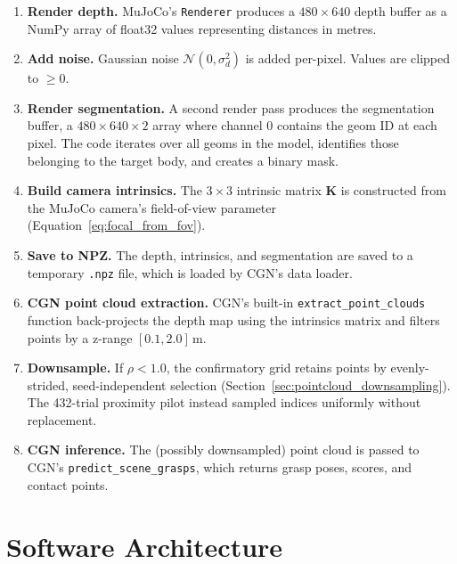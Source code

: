 \documentclass[11pt,a4paper]{report}
\begin{document}
\begin{enumerate}
  \item \textbf{Render depth.} MuJoCo's \texttt{Renderer} produces a $480 \times 640$ depth buffer as a NumPy array of float32 values representing distances in metres.

  \item \textbf{Add noise.} Gaussian noise $\mathcal{N}(0, \sigma_d^2)$ is added per-pixel. Values are clipped to $\geq 0$.

  \item \textbf{Render segmentation.} A second render pass produces the segmentation buffer, a $480 \times 640 \times 2$ array where channel 0 contains the geom ID at each pixel. The code iterates over all geoms in the model, identifies those belonging to the target body, and creates a binary mask.

  \item \textbf{Build camera intrinsics.} The $3 \times 3$ intrinsic matrix $\mathbf{K}$ is constructed from the MuJoCo camera's field-of-view parameter (Equation~\ref{eq:focal_from_fov}).

  \item \textbf{Save to NPZ.} The depth, intrinsics, and segmentation are saved to a temporary \texttt{.npz} file, which is loaded by CGN's data loader.

  \item \textbf{CGN point cloud extraction.} CGN's built-in \texttt{extract\_point\_clouds} function back-projects the depth map using the intrinsics matrix and filters points by a z-range $[0.1, 2.0]$\,m.

  \item \textbf{Downsample.} If $\rho < 1.0$, the confirmatory grid retains points by evenly-strided, seed-independent selection (Section~\ref{sec:pointcloud_downsampling}). The 432-trial proximity pilot instead sampled indices uniformly without replacement.

  \item \textbf{CGN inference.} The (possibly downsampled) point cloud is passed to CGN's \texttt{predict\_scene\_grasps}, which returns grasp poses, scores, and contact points.
\end{enumerate}

\section{Software Architecture}
\label{sec:software_architecture}
\end{document}
